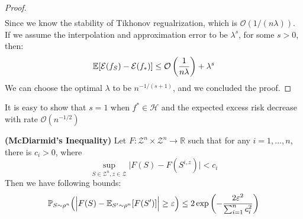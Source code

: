 \begin{proof}
\begin{equation*}
\begin{aligned}
    \end{aligned}
    \end{equation*}
    Since we know the stability of Tikhonov regualrization, which is $\mathcal{O}(1/(n\lambda))$. If we assume the interpolation and approximation error to be $\lambda^s$, for some $s>0$, then:
    \begin{equation*}
        \mathbb{E}[\mathcal{E}(f_S) - \mathcal{E}(f_*)] \le \mathcal{O}\left( \frac{1}{n\lambda} \right) + \lambda^s
    \end{equation*}
    We can choose the optimal $\lambda$ to be $n^{-1/(s+1)}$, and we concluded the proof.
\end{proof}

\begin{remark}
    It is easy to show that $s=1$ when $f^*\in\mathcal{H}$ and the expected excess risk decrease with rate $\mathcal{O}(n^{-1/2})$
\end{remark}

\begin{theorem}{\textbf{(McDiarmid's Inequality)}}
Let $F: \mathcal{Z}^n \times \mathcal{Z}^n \rightarrow \mathbb{R} $ such that for any $i=1,\dots,n$, there is $c_i>0$, where 
\begin{equation*}
    \sup_{S\in\mathcal{Z}^n, z\in\mathcal{Z}} \Big|F(S) - F(S^{i, z})\Big| < c_i
\end{equation*}
Then we have following bounds:
\begin{equation*}
    \mathbb{P}_{S\sim\rho^n}\Big( \Big| F(S) - \mathbb{E}_{S'\sim\rho^n}[F(S')] \Big| \ge\varepsilon \Big) \le 2\exp\left( -\frac{2\varepsilon^2}{\sum^n_{i=1}c^2_i} \right)
\end{equation*}
\end{theorem}

